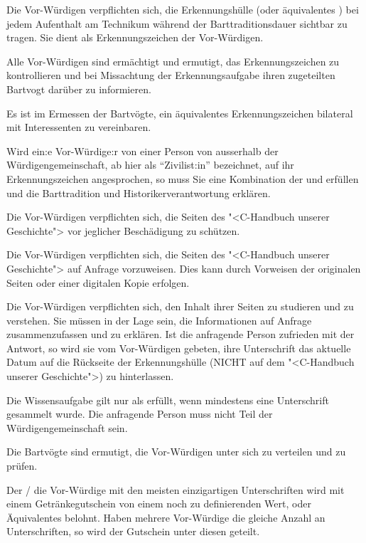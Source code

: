 \documentclass[fontsize=12pt,parskip=half]{scrartcl}
\begin{document}
\begin{contract}
  \SubClause[title={Erkennungsaufgabe}]\label{H.erkennungsaufgabe}
  Die Vor-Würdigen verpflichten sich, die Erkennungshülle (oder äquivalentes ) bei jedem Aufenthalt am Technikum während der
  Barttraditionsdauer sichtbar zu tragen. Sie dient als Erkennungszeichen der Vor-Würdigen.

  Alle Vor-Würdigen sind ermächtigt und ermutigt, das Erkennungszeichen zu kontrollieren und bei Missachtung der Erkennungsaufgabe ihren zugeteilten Bartvogt darüber zu informieren.

  Es ist im Ermessen der Bartvögte, ein äquivalentes Erkennungszeichen bilateral mit Interessenten zu vereinbaren.\label{aequivalentes}

  Wird ein:e Vor-Würdige:r von einer Person von ausserhalb der Würdigengemeinschaft, ab hier als ``Zivilist:in'' bezeichnet, auf ihr Erkennungszeichen angesprochen, so muss Sie eine Kombination
  der  und  erfüllen und die Barttradition und Historikerverantwortung  erklären.

  \SubClause[title={Schutzaufgabe}]\label{H.schutzaufgabe}
  Die Vor-Würdigen verpflichten sich, die Seiten des "<C-Handbuch unserer Geschichte"> vor jeglicher Beschädigung zu schützen.

  \SubClause[title={Vorweisaufgabe}]\label{H.vorweisaufgabe}
  Die Vor-Würdigen verpflichten sich, die Seiten des "<C-Handbuch unserer Geschichte"> auf Anfrage vorzuweisen. Dies kann durch Vorweisen der originalen
  Seiten oder einer digitalen Kopie erfolgen.

  \SubClause[title={Wissensaufgabe}]\label{H.wissensaufgabe}
  Die Vor-Würdigen verpflichten sich, den Inhalt ihrer Seiten zu studieren und zu verstehen. Sie müssen in der Lage sein, die Informationen
  auf Anfrage zusammenzufassen und zu erklären. Ist die anfragende Person zufrieden mit der Antwort, so wird sie vom Vor-Würdigen gebeten,
  ihre Unterschrift das aktuelle Datum auf die Rückseite der Erkennungshülle (NICHT auf dem "<C-Handbuch unserer Geschichte">) zu hinterlassen.

  Die Wissensaufgabe gilt nur als erfüllt, wenn mindestens eine Unterschrift gesammelt wurde. Die anfragende Person muss nicht Teil der Würdigengemeinschaft sein.

  Die Bartvögte sind ermutigt, die Vor-Würdigen unter sich zu verteilen und zu prüfen.

  Der / die Vor-Würdige mit den meisten einzigartigen Unterschriften wird mit einem Getränkegutschein von einem noch zu definierenden Wert, oder Äquivalentes
  belohnt. Haben mehrere Vor-Würdige die gleiche Anzahl an Unterschriften, so wird der Gutschein unter diesen geteilt.


\end{contract}
\end{document}
